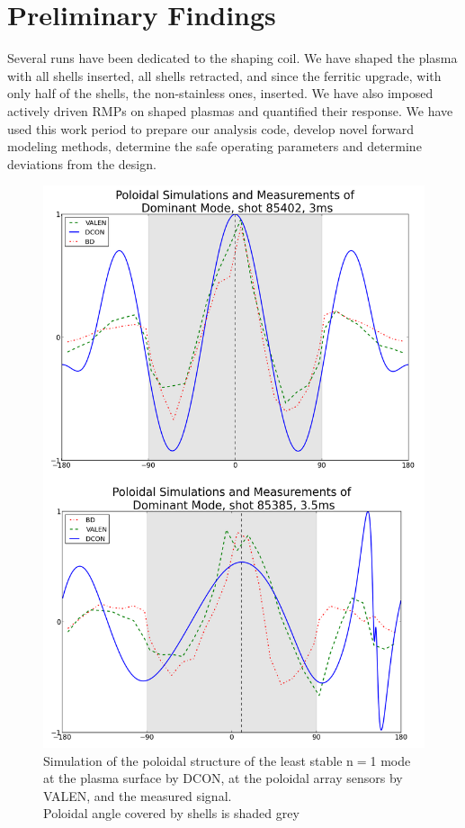 \documentclass[aps,prl,twocolumn,superscriptaddress,groupedaddress]{revtex4}  %
\begin{document}
\section{Preliminary Findings}
	Several runs have been dedicated to the shaping coil.  We have shaped the plasma with all shells inserted, all shells retracted, and since the ferritic upgrade, with only half of the shells, the non-stainless ones, inserted.  We have also imposed actively driven RMPs on shaped plasmas and quantified their response.  We have used this work period to prepare our analysis code, develop novel forward modeling methods, determine the safe operating parameters and determine deviations from the design. \par 
\begin{figure}[b]
	\centering
\includegraphics[scale=.22]{../Plots/DCON_VALEN_BD_comp_sh_unsh.png}\caption{Simulation of the poloidal structure of the least stable n$=$1 mode at the plasma surface by DCON, at the poloidal array sensors by VALEN, and the measured signal.\\  Poloidal angle covered by shells is shaded grey}
	\label{nat_mode_sim_v_meas}
	\end{figure}
\end{document}
